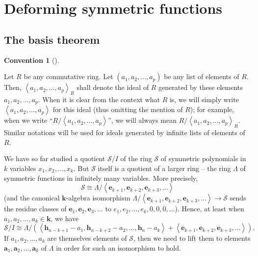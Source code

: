 \documentclass[numbers=enddot,12pt,final,onecolumn,notitlepage]{scrartcl}%
\theoremstyle{definition}
\newtheorem{conv}[theo]{Convention}
\newenvironment{convention}[1][]
{\begin{conv}[#1]\begin{leftbar}}
{\end{leftbar}\end{conv}}
\newenvironment{convention}[1][Convention]{\noindent\textbf{#1.} }{\ \rule{0.5em}{0.5em}}
\newenvironment{convention}[1][Convention]{\noindent\textbf{#1.} }{\ \rule{0.5em}{0.5em}}
\begin{document}
\section{\label{sect.bigquot}Deforming symmetric functions}

\subsection{The basis theorem}

\begin{convention}
Let $R$ be any commutative ring. Let $\left(  a_{1},a_{2},\ldots,a_{p}\right)
$ be any list of elements of $R$. Then, $\left\langle a_{1},a_{2},\ldots
,a_{p}\right\rangle _{R}$ shall denote the ideal of $R$ generated by these
elements $a_{1},a_{2},\ldots,a_{p}$. When it is clear from the context what
$R$ is, we will simply write $\left\langle a_{1},a_{2},\ldots,a_{p}%
\right\rangle $ for this ideal (thus omitting the mention of $R$); for
example, when we write \textquotedblleft$R/\left\langle a_{1},a_{2}%
,\ldots,a_{p}\right\rangle $\textquotedblright, we will always mean
$R/\left\langle a_{1},a_{2},\ldots,a_{p}\right\rangle _{R}$. Similar notations
will be used for ideals generated by infinite lists of elements of $R$.
\end{convention}

We have so far studied a quotient $\mathcal{S}/I$ of the ring $\mathcal{S}$ of
symmetric polynomials in $k$ variables $x_{1},x_{2},\ldots,x_{k}$. But
$\mathcal{S}$ itself is a quotient of a larger ring -- the ring $\Lambda$ of
symmetric functions in infinitely many variables. More precisely,%
\[
\mathcal{S}\cong\Lambda/\left\langle \mathbf{e}_{k+1},\mathbf{e}%
_{k+2},\mathbf{e}_{k+3},\ldots\right\rangle
\]
(and the canonical $\mathbf{k}$-algebra isomorphism $\Lambda/\left\langle
\mathbf{e}_{k+1},\mathbf{e}_{k+2},\mathbf{e}_{k+3},\ldots\right\rangle
\rightarrow\mathcal{S}$ sends the residue classes of $\mathbf{e}%
_{1},\mathbf{e}_{2},\mathbf{e}_{3},\ldots$ to $e_{1},e_{2},\ldots
,e_{k},0,0,0,\ldots$). Hence, at least when $a_{1},a_{2},\ldots,a_{k}%
\in\mathbf{k}$, we have%
\[
\mathcal{S}/I\cong\Lambda/\left(  \left\langle \mathbf{h}_{n-k+1}%
-a_{1},\mathbf{h}_{n-k+2}-a_{2},\ldots,\mathbf{h}_{n}-a_{k}\right\rangle
+\left\langle \mathbf{e}_{k+1},\mathbf{e}_{k+2},\mathbf{e}_{k+3}%
,\ldots\right\rangle \right)  .
\]
If $a_{1},a_{2},\ldots,a_{k}$ are themselves elements of $\mathcal{S}$, then
we need to lift them to elements $\mathbf{a}_{1},\mathbf{a}_{2},\ldots
,\mathbf{a}_{k}$ of $\Lambda$ in order for such an isomorphism to hold.
\end{document}
